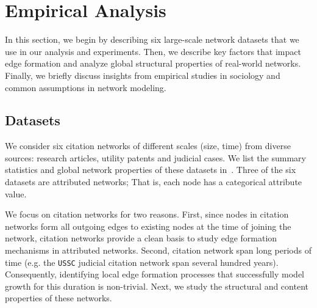 
\section{Empirical Analysis}
\label{sec:Analysis}

In this section, we begin by describing six large-scale network datasets that we use in our
analysis and experiments. Then, we
describe key factors that impact edge formation and analyze global structural
properties of real-world networks. Finally, we briefly discuss insights from
empirical studies in sociology and common assumptions in network modeling.

\subsection{Datasets}
\label{sec:Datasets}

We consider six citation networks of different scales (size, time) from diverse
sources: research articles, utility patents and judicial cases. We list the
summary statistics and global network properties of these datasets in~.
Three of the six datasets are attributed networks; That is, each node has a categorical attribute value.

We focus on citation networks for two reasons. First, since nodes in citation networks form
all outgoing edges to existing nodes at the time of joining the network,
citation networks provide a clean basis to study edge formation mechanisms in
attributed networks. Second, citation network span long periods of time (e.g.
the \texttt{USSC} judicial citation network span several hundred years).
Consequently, identifying local edge formation processes that successfully model
growth for this duration is non-trivial.
Next, we study the structural and content properties of these networks.

